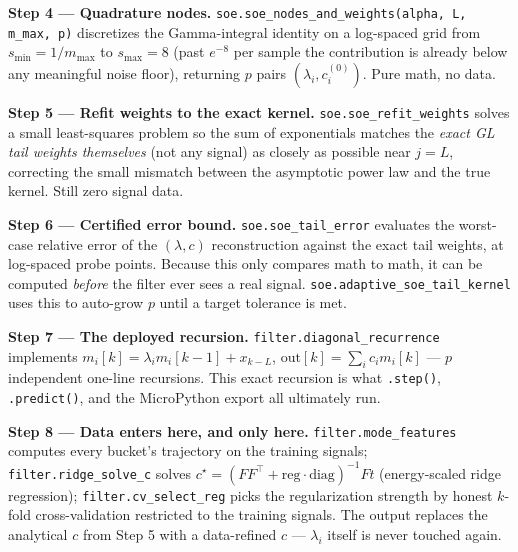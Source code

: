 \documentclass[11pt]{article}
\begin{document}
\begin{stepbox}
\textbf{Step 4 --- Quadrature nodes.} \texttt{soe.soe\_nodes\_and\_weights(alpha, L, m\_max, p)} discretizes the Gamma-integral identity on a log-spaced grid from $s_{\min}=1/m_{\max}$ to $s_{\max}=8$ (past $e^{-8}$ per sample the contribution is already below any meaningful noise floor), returning $p$ pairs $(\lambda_i, c_i^{(0)})$. Pure math, no data.
\end{stepbox}

\begin{stepbox}
\textbf{Step 5 --- Refit weights to the exact kernel.} \texttt{soe.soe\_refit\_weights} solves a small least-squares problem so the sum of exponentials matches the \emph{exact GL tail weights themselves} (not any signal) as closely as possible near $j=L$, correcting the small mismatch between the asymptotic power law and the true kernel. Still zero signal data.
\end{stepbox}

\begin{stepbox}
\textbf{Step 6 --- Certified error bound.} \texttt{soe.soe\_tail\_error} evaluates the worst-case relative error of the $(\lambda,c)$ reconstruction against the exact tail weights, at log-spaced probe points. Because this only compares math to math, it can be computed \emph{before} the filter ever sees a real signal. \texttt{soe.adaptive\_soe\_tail\_kernel} uses this to auto-grow $p$ until a target tolerance is met.
\end{stepbox}

\begin{stepbox}
\textbf{Step 7 --- The deployed recursion.} \texttt{filter.diagonal\_recurrence} implements $m_i[k]=\lambda_i m_i[k-1]+x_{k-L}$, $\text{out}[k]=\sum_i c_i m_i[k]$ --- $p$ independent one-line recursions. This exact recursion is what \texttt{.step()}, \texttt{.predict()}, and the MicroPython export all ultimately run.
\end{stepbox}

\begin{stepbox}
\textbf{Step 8 --- Data enters here, and only here.} \texttt{filter.mode\_features} computes every bucket's trajectory on the training signals; \texttt{filter.ridge\_solve\_c} solves $c^\star=(FF^\top+\text{reg}\cdot\text{diag})^{-1}Ft$ (energy-scaled ridge regression); \texttt{filter.cv\_select\_reg} picks the regularization strength by honest $k$-fold cross-validation restricted to the training signals. The output replaces the analytical $c$ from Step 5 with a data-refined $c$ --- $\lambda_i$ itself is never touched again.
\end{stepbox}
\end{document}
